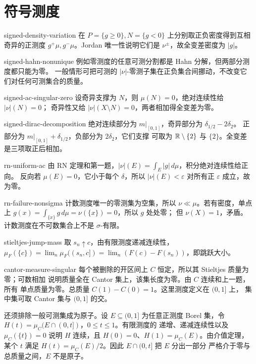 \chapter{符号测度}
\begin{solution}{signed-density-variation}
在 \(P=\{g\ge0\},N=\{g<0\}\) 上分别取正负密度得到互相奇异的正测度
\(g^+\mu,g^-\mu\)。Jordan 唯一性说明它们是 \(\nu^\pm\)，故全变差密度为 \(|g|\)。
\end{solution}
\begin{solution}{signed-hahn-nonunique}
例如零测度的任意可测分割都是 Hahn 分解，但两部分测度都只能为零。
一般情形可把可测的 \(|\nu|\)-零测子集在正负集合间挪动，不改变它们对任何可测集合的质量。
\end{solution}
\begin{solution}{signed-ac-singular-zero}
设奇异支撑为 \(N\)，则 \(\mu(N)=0\)，绝对连续性给 \(|\nu|(N)=0\)；
奇异性又给 \(|\nu|(X\setminus N)=0\)，两者相加得全变差为零。
\end{solution}
\begin{solution}{signed-dirac-decomposition}
绝对连续部分为 \(m|_{[0,1]}\)，奇异部分为 \(\delta_{1/2}-2\delta_2\)。
正部分为 \(m|_{[0,1]}+\delta_{1/2}\)，负部分为 \(2\delta_2\)，它们支撑
可取为 \(\mathbb{R}\setminus\{2\}\) 与 \(\{2\}\)。全变差是三项取正后相加。
\end{solution}
\begin{solution}{rn-uniform-ac}
由 RN 定理和第一题，\(|\nu|(E)=\int_E|g|\,d\mu\)，积分绝对连续性给正向。
反向若 \(\mu(E)=0\)，它小于每个 \(\delta\)，所以 \(|\nu|(E)<\varepsilon\)
对所有正 \(\varepsilon\) 成立，故为零。
\end{solution}
\begin{solution}{rn-failure-nonsigma}
计数测度唯一的零测集为空集，所以 \(\nu\ll\mu\)。若有密度，单点上
\(g(x)=\int_{\{x\}}g\,d\mu=\nu(\{x\})=0\)，所以 \(g\) 处处零；
但 \(\nu(X)=1\)，矛盾。计数测度在不可数集合上不是 \(\sigma\)-有限。
\end{solution}
\begin{solution}{stieltjes-jump-mass}
取 \(s_n\uparrow c\)，由有限测度递减连续性，
\(\mu_F(\{c\})=\lim_n\mu_F((s_n,c])=\lim_n(F(c)-F(s_n))\)，即跳跃大小。
\end{solution}
\begin{solution}{cantor-measure-singular}
每个被删除的开区间上 \(C\) 恒定，所以其 Stieltjes 质量为零；可数相加
说明质量全在 Cantor 集上，该集长度为零。由 \(C\) 连续和上一题，所有
单点质量为零。总质量 \(C(1)-C(0)=1\)。这里测度定义在 \((0,1]\) 上，
集中集可取 Cantor 集与 \((0,1]\) 的交。

还须排除一般可测集成为原子。设 \(E\subseteq(0,1]\) 为任意正测度
Borel 集，令 \(H(t)=\mu_C(E\cap(0,t])\)，\(0\le t\le1\)。有限测度的
递增、递减连续性以及 \(\mu_C(\{t\})=0\) 说明 \(H\) 连续，且
\(H(0)=0\)、\(H(1)=\mu_C(E)\)。由介值定理，某个 \(t\) 满足
\(H(t)=\mu_C(E)/2\)。因此 \(E\cap(0,t]\) 把 \(E\) 分出一部分
严格介于零与总质量之间，\(E\) 不是原子。
\end{solution}
